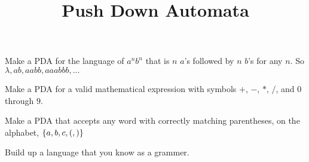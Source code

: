 \documentclass{article}
\title{Push Down Automata}
\begin{document}
	
	\maketitle
	 Make a PDA for the language of $a^nb^n$ that is $n$ $a$'s followed by $n$ $b$'s for any $n$. So ${\lambda, ab, aabb, aaabbb,\ldots}$
	
	\bigskip
	\bigskip
	\bigskip
	\bigskip
	\bigskip
	\bigskip
	
	 Make a PDA for a valid mathematical expression with symbols $+$, $-$, $*$, $/$, and $0$ through $9$.
	
	\bigskip
	\bigskip
	\bigskip
	\bigskip
	\bigskip
	\bigskip
		
	 Make a PDA that accepts any word with correctly matching parentheses, on the alphabet, $\left\{ {a,b,c,(,)} \right\}$
		
	\bigskip
	\bigskip
	\bigskip
	\bigskip
	\bigskip
	\bigskip
	
	 Build up a language that you know as a grammer.
	
	
\end{document}

